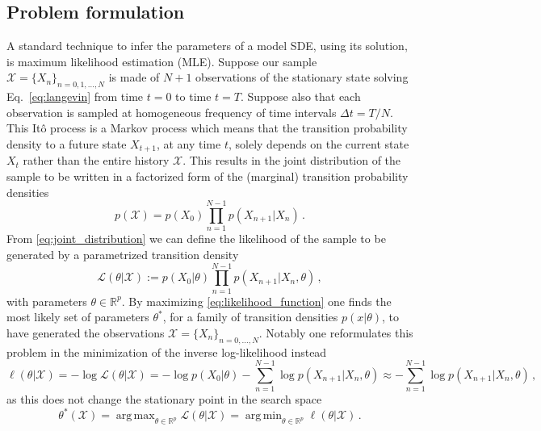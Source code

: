 \documentclass[a4paper,fleqn]{cas-sc}
\DeclareMathOperator*{\argmin}{\arg\,min}
\DeclareMathOperator*{\argmax}{\arg\,max}
\begin{document}
\subsection{Problem formulation}\label{subsec:formulation}
A standard technique to infer the parameters of a model SDE, using its solution, is maximum likelihood estimation (MLE).
Suppose our sample $\mathcal{X}=\{X_{n}\}_{n=0,1,\dots,N}$ is made of $N+1$ observations of the stationary state solving Eq.~\eqref{eq:langevin} from time $t=0$ to time $t=T$.
Suppose also that each observation is sampled at homogeneous frequency of time intervals $\Delta t = T/N$.
This It\^{o} process is a Markov process \cite[Ch.7, p. 111]{Oksendal2000} which means that the transition probability density to a future state $X_{t+1}$, at any time $t$, solely depends on the current state $X_{t}$ rather than the entire history $\mathcal{X}$.
This results in the joint distribution of the sample to be written in a factorized form of the (marginal) transition probability densities
%
\begin{equation}\label{eq:joint_distribution}
        p(\mathcal{X}) = p(X_{0})\prod_{n=1}^{N-1}p(X_{n+1}|X_{n})\,.
\end{equation}
%
From \eqref{eq:joint_distribution} we can define the likelihood of the sample to be generated by a parametrized transition density 
\begin{equation}\label{eq:likelihood_function}
        \mathcal{L}(\theta|\mathcal{X}) := p(X_{0}|\theta)\prod_{n=1}^{N-1}p(X_{n+1}|X_{n},\theta)\,,
\end{equation}
%
with parameters $\theta\in\mathbb{R}^p$.
By maximizing \eqref{eq:likelihood_function} one finds the most likely set of parameters $\theta^{*}$, for a family of transition densities $p(x|\theta)$, to have generated the observations $\mathcal{X} = \{X_{n}\}_{n=0,\dots,N}$.
Notably one reformulates this problem in the minimization of the inverse log-likelihood instead
%
\begin{equation}\label{eq:inv_log_likelihood}
        \ell(\theta|\mathcal{X}) = -\log\mathcal{L}(\theta|\mathcal{X}) = -\log p(X_{0}|\theta) - \sum_{n=1}^{N-1}\log p(X_{n+1}|X_{n},\theta) \approx -\sum_{n=1}^{N-1}\log p(X_{n+1}|X_{n},\theta) \,,
\end{equation}
%
as this does not change the stationary point in the search space
%
\begin{equation}\label{eq:mle}
        \theta^{*}(\mathcal{X}) = \argmax_{\theta\in \mathbb{R}^{p}}\mathcal{L}(\theta|\mathcal{X}) = \argmin_{\theta\in \mathbb{R}^{p}}\ell(\theta|\mathcal{X})\,.
\end{equation}
\end{document}
